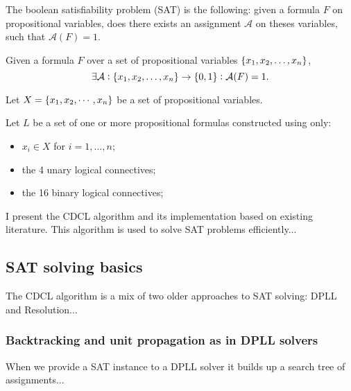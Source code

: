 The boolean satisfiability problem (SAT) is the following: given a formula $F$ on propositional variables, does there exists an assignment $\mathcal{A}$ on theses variables, such that $\mathcal{A}(F)=1$.

Given a formula $F$ over a set of propositional variables $\set{x_1,x_2,\dots,x_n}$, \[
\exists\mathcal{A}:\set{x_1,x_2,\dots,x_n}\to\set{0,1}:\mathcal{A}(F)=1.
\]
\newpage
\fi

\begin{tcolorbox}[colframe=defcolor,title={\color{white}\bf Boolean Satisfiability Problem (SAT)}]
\begin{definition}
Let $X=\set{x_1,x_2,\cdots, x_n}$ be a set of propositional variables.

Let $L$ be a set of one or more propositional formulas constructed using only:
\begin{itemize}
	\item $x_i\in X$ for $i=1,\dots,n$;
	\item the 4 unary logical connectives;
	\item the 16 binary logical connectives;
\end{itemize}

%
%
%
%
\end{definition}
\end{tcolorbox}


	I present the CDCL algorithm and its implementation based on existing literature. This algorithm is used to solve SAT problems efficiently...

\subsection{SAT solving basics}

The CDCL algorithm is a mix of two older approaches to SAT solving: DPLL and Resolution...

\subsubsection{Backtracking and unit propagation as in DPLL solvers}

When we provide a SAT instance to a DPLL solver it builds up a search tree of assignments...

